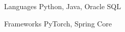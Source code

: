 
\begin{cvskills}
  \cvskill
    {Languages} %
    {Python, Java, Oracle SQL} %

  \cvskill
    {Frameworks} %
    {PyTorch, Spring Core} %

  \iffalse
  \cvskill
    {UI Technologies} %
    {HTML5, CSS3} %

  \cvskill
    {IDEs} %
    {Anaconda, Eclipse, Netbeans} %

  \cvskill
    {Servers} %
    {Tomcat, Weblogic, Glassfish} %

  \cvskill
    {Tools} %
    {Git, SVN, Maven} %
  \fi  
\end{cvskills}
